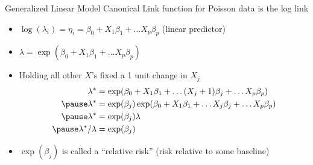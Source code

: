 \documentclass[handout]{beamer}\usepackage[]{graphicx}\usepackage[]{color}
\begin{document}
\begin{frame}{Generalized Linear Model}
Canonical Link function for Poisson data is the log link   \pause
\begin{itemize}
\item $\log(\lambda_i) = \eta_i = \beta_0 + X_1 \beta_1 + \ldots X_p \beta_p $ (linear predictor)  \pause
\item $\lambda = \exp( \beta_0 + X_1 \beta_1 + \ldots X_p \beta_p) $  \pause
\item Holding all other $X$'s fixed a 1 unit change in $X_j$  \pause
  \begin{align*}
     \lambda^* & = \exp( \beta_0 + X_1 \beta_1 + \ldots (X_j + 1)\beta_j
     + \ldots X_p \beta_p) \\ \pause
 \lambda^* & = \exp(\beta_j) \exp( \beta_0 + X_1 \beta_1 + \ldots X_j \beta_j
     + \ldots X_p \beta_p) \\  \pause
\lambda^* & = \exp(\beta_j) \lambda \\  \pause
\lambda^*/\lambda & =  \exp(\beta_j)
  \end{align*}
\item $\exp(\beta_j)$ is called a ``relative risk''  (risk relative to
  some baseline)
\end{itemize}
\end{frame}
\end{document}
